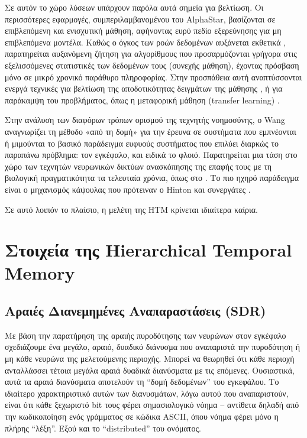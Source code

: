	Σε αυτόν το χώρο λύσεων υπάρχουν παρόλα αυτά σημεία για βελτίωση.
	Οι περισσότερες εφαρμογές, συμπεριλαμβανομένου του AlphaStar, βασίζονται σε επιβλεπόμενη και ενισχυτική μάθηση,
	αφήνοντας ευρύ πεδίο εξερεύνησης για μη επιβλεπόμενα μοντέλα.
	Καθώς ο όγκος των ροών δεδομένων αυξάνεται εκθετικά \parencite{losingIncrementalOnlineLearning2018},
	παρατηρείται αυξανόμενη ζήτηση για αλγορίθμους που προσαρμόζονται γρήγορα στις εξελισσόμενες στατιστικές των δεδομένων τους (συνεχής μάθηση),
	έχοντας πρόσβαση μόνο σε μικρό χρονικό παράθυρο πληροφορίας.
	Στην προσπάθεια αυτή αναπτύσσονται ενεργά τεχνικές για βελτίωση της αποδοτικότητας δειγμάτων της μάθησης \parencite[όπως][]{nachumDataEfficientHierarchicalReinforcement2018},
	ή για παράκαμψη του προβλήματος, όπως η μεταφορική μάθηση (transfer learning) \parencite{xiongApplicationTransferLearning2018}.
	\medskip

	Στην ανάλυση των διαφόρων τρόπων ορισμού της τεχνητής νοημοσύνης, ο Wang \parencite{wangWhatYouMean2008} αναγνωρίζει τη μέθοδο
	«από τη δομή» για την έρευνα σε συστήματα που εμπνέονται ή μιμούνται
	το βασικό παράδειγμα ευφυούς συστήματος που επιλύει διαρκώς το παραπάνω πρόβλημα: τον εγκέφαλο, και ειδικά το φλοιό.
	Παρατηρείται μια τάση στο χώρο των τεχνητών νευρωνικών δικτύων ανασκόπησης της επαφής τους με τη βιολογική πραγματικότητα τα τελευταία χρόνια,
	όπως στο \cite{bengioBiologicallyPlausibleDeep2015}.
	Το πιο ηχηρό παράδειγμα είναι ο μηχανισμός κάψουλας που πρότειναν ο Hinton και συνεργάτες \parencite{sabourMatrixCapsulesEM2018,sabourDynamicRoutingCapsules2017}.
	\smallskip

	Σε αυτό λοιπόν το πλαίσιο, η μελέτη της HTM κρίνεται ιδιαίτερα καίρια.


\section{Στοιχεία της Hierarchical Temporal Memory}

\subsection{Αραιές Διανεμημένες Αναπαραστάσεις (SDR)}

Με βάση την παρατήρηση της αραιής πυροδότησης των νευρώνων στον εγκέφαλο σχεδιάζουμε ένα μεγάλο, αραιό, δυαδικό διάνυσμα που αναπαριστά την πυροδότηση ή μη κάθε νευρώνα της μελετούμενης περιοχής.
Μπορεί να θεωρηθεί ότι κάθε περιοχή ανταλλάσσει τέτοια μεγάλα αραιά δυαδικά διανύσματα με τις επόμενες.
Ουσιαστικά, αυτά τα αραιά διανύσματα αποτελούν τη ``δομή δεδομένων'' \cite{neuronssynapses,sdrkanerva} του εγκεφάλου.
Το ιδιαίτερο χαρακτηριστικό αυτών των διανυσμάτων, λόγω αυτού που αναπαριστούν, είναι ότι κάθε ξεχωριστό bit τους φέρει σημασιολογικό νόημα -- αντίθετα δηλαδή από την κωδικοποίηση ενός γράμματος σε κώδικα ASCII, όπου νόημα φέρει μόνο η πλήρης ``λέξη''.
Εξού και το ``distributed'' του ονόματος.

